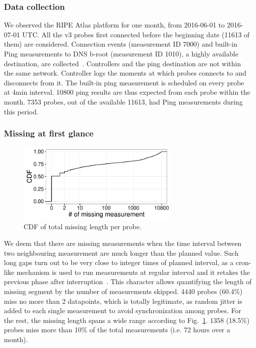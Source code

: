 \subsubsection{Data collection}
We observed the RIPE Atlas platform for one month, from 2016-06-01 to 2016-07-01 UTC.
All the v3 probes first connected before the beginning date (11613 of them) are considered.
Connection events (measurement ID 7000) and built-in Ping measurements to DNS b-root (measurement ID 1010), a highly available destination, are collected~\cite{built-in}. 
Controllers and the ping destination are not within the same network.
Controller logs the moments at which probes connects to and disconnects from it.
The built-in ping measurement is scheduled on every probe at 4min interval. 
10800 ping results are thus expected from each probe within the month.
7353 probes, out of the available 11613, had Ping measurements during this period.

\subsubsection{Missing at first glance}
\begin{figure}
\centering
\includegraphics[width=0.7\textwidth]{gfx/chap3/missing_length_cdf.pdf}
\caption{CDF of total missing length per probe.}
\label{fig:miss_len}
\end{figure}
We deem that there are missing measurements when the time interval between two neighbouring measurement are much longer than the planned value. 
Such long gaps turn out to be very close to integer times of planned interval, as a cron-like mechanism is used to run measurements at regular interval and it retakes the previous phase after interruption~\cite{source, schedule}.
This character allows quantifying the length of missing segment by the number of measurements skipped.
4440 probes  (60.4\%) miss no more than 2 datapoints, which is totally legitimate, as random jitter is added to each single measurement to avoid synchronization among probes.
For the rest, the missing length spans a wide range according to Fig.~\ref{fig:miss_len}.
1358 (18.5\%) probes miss more than 10\% of the total measurements (i.e. 72 hours over a month).

